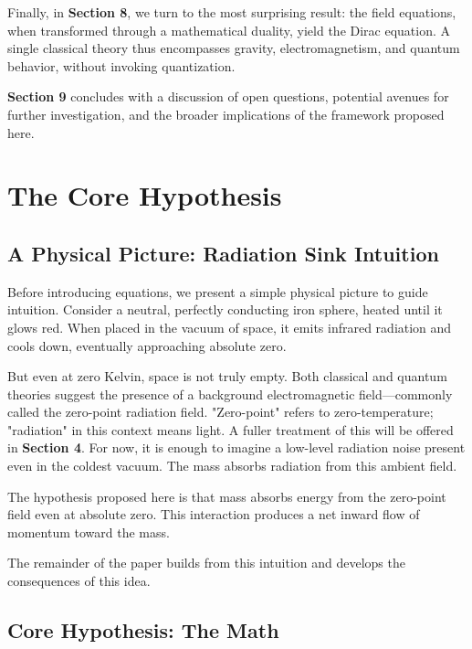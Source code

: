 \documentclass {article}
\begin{document}
Finally, in \textbf{Section 8}, we turn to the most surprising result: the field equations, when transformed through a mathematical duality, yield the Dirac equation. A single classical theory thus encompasses gravity, electromagnetism, and quantum behavior, without invoking quantization.

\textbf{Section 9} concludes with a discussion of open questions, potential avenues for further investigation, and the broader implications of the framework proposed here.

\section{The Core Hypothesis}

\subsection{A Physical Picture: Radiation Sink Intuition }
\label{subsec:intuition}

Before introducing equations, we present a simple physical picture to guide intuition. Consider a neutral, perfectly conducting iron sphere, heated until it glows red. When placed in the vacuum of space, it emits infrared radiation and cools down, eventually approaching absolute zero.

But even at zero Kelvin, space is not truly empty. Both classical and quantum theories suggest the presence of a background electromagnetic field—commonly called the zero-point radiation field. "Zero-point" refers to zero-temperature; "radiation" in this context means light. A fuller treatment of this will be offered in \textbf{Section 4}. For now, it is enough to imagine a low-level radiation noise present even in the coldest vacuum. The mass absorbs radiation from this ambient field.

The hypothesis proposed here is that mass absorbs energy from the zero-point field even at absolute zero. This interaction produces a net inward flow of momentum toward the mass.

The remainder of the paper builds from this intuition and develops the consequences of this idea.


\subsection{Core Hypothesis: The Math}
\end{document}

